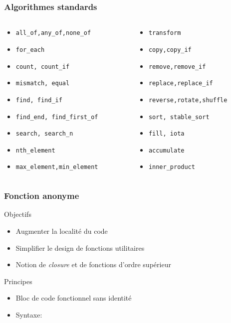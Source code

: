 \documentclass[svgnames]{beamer}
\begin{document}
\frame
{
  \frametitle{Algorithmes standards}
  \begin{columns}[t]
    \begin{column}{5cm}
    \begin{itemize}
    \item \texttt{all\_of,any\_of,none\_of}
    \item \texttt{for\_each}
    \item \texttt{count, count\_if}
    \item \texttt{mismatch, equal}
    \item \texttt{find, find\_if}
    \item \texttt{find\_end, find\_first\_of}
    \item \texttt{search, search\_n}
    \item \texttt{nth\_element}
    \item \texttt{max\_element,min\_element}
    \end{itemize}
    \end{column}
    \begin{column}{5cm}
    \begin{itemize}
    \item \texttt{transform}
    \item \texttt{copy,copy\_if}
    \item \texttt{remove,remove\_if}
    \item \texttt{replace,replace\_if}
    \item \texttt{reverse,rotate,shuffle}
    \item \texttt{sort, stable\_sort}
    \item \texttt{fill, iota}
    \item \texttt{accumulate}
    \item \texttt{inner\_product}
    \end{itemize}
    \end{column}
  \end{columns}
}

\frame
{
  \frametitle{Fonction anonyme}
  \begin{block}{Objectifs}
  \begin{itemize}
  \item Augmenter la localit\'e du code
  \item Simplifier le design de fonctions utilitaires
  \item Notion de \textit{closure} et de fonctions d'ordre sup\'erieur
  \end{itemize}
  \end{block}

  \begin{block}{Principes}
  \begin{itemize}
  \item Bloc de code fonctionnel sans identit\'e
  \item Syntaxe:\\
  \end{itemize}    
  \end{block}
}
\end{document}

